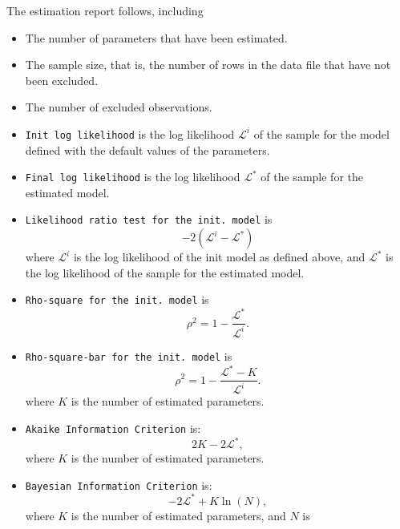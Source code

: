 \documentclass[12pt,a4paper]{article}
\begin{document}
The estimation report follows, including
   \begin{itemize}
      \item The number of parameters that have been estimated.
      \item The sample size, that is, the number of rows in
        the data file  that have not been excluded.
      \item The number of excluded observations.
      \item \lstinline+Init log likelihood+ is the log likelihood
        $\mathcal{L}^i$ of
        the sample for the model defined with the default values of
        the parameters. 
      \item \lstinline+Final log likelihood+ is the log likelihood
        $\mathcal{L}^*$ of the sample for the estimated model. 
      \item \lstinline+Likelihood ratio test for the init. model+ is 
         \begin{equation}
            -2 ( \mathcal{L}^i - \mathcal{L}^*)
         \end{equation}
         where 
         $ \mathcal{L}^i$ is the log likelihood of the init model
         as defined above, and $\mathcal{L}^*$ is the log likelihood of the sample for the estimated model. 
      \item \lstinline+Rho-square for the init. model+ is
         \begin{equation}
            \rho^2 = 1 - \frac{\mathcal{L}^*}{\mathcal{L}^i}.
         \end{equation}
        \item \lstinline+Rho-square-bar for the init. model+ is
         \begin{equation}
            \rho^2 = 1 - \frac{\mathcal{L}^* - K}{\mathcal{L}^i}.
         \end{equation}
         where $K$ is the number of estimated parameters.
       \item \lstinline+Akaike Information Criterion+ is:
         \begin{equation}
          2 K - 2 \mathcal{L}^*,
         \end{equation}
         where $K$ is the number of estimated parameters.
       \item \lstinline+Bayesian Information Criterion+ is:
         \begin{equation}
 - 2 \mathcal{L}^* + K \ln(N),
         \end{equation}
         where  $K$ is the number of estimated parameters, and $N$ is

\end{itemize}
\end{document}
